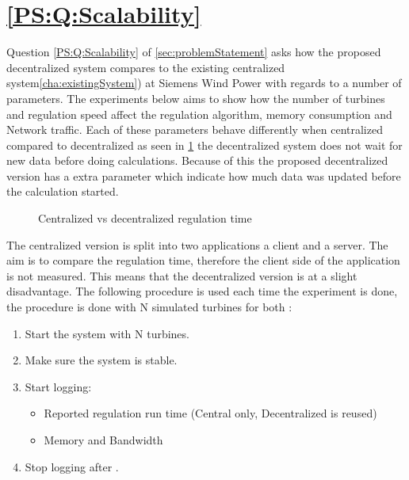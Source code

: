 \section{\ref{PS:Q:Scalability}}
Question \ref{PS:Q:Scalability} of \cref{sec:problemStatement} asks how the proposed decentralized system compares to the existing centralized system\cref{cha:existingSystem}) at Siemens Wind Power with regards to a number of parameters.
The experiments below aims to show how the number of turbines and regulation speed affect the regulation algorithm, memory consumption and Network traffic.
Each of these parameters behave differently when centralized compared to decentralized as seen in \cref{fig:timingCentralVSDecentral} the decentralized system does not wait for new data before doing calculations. Because of this the proposed decentralized version has a extra parameter which indicate how much data was updated before the calculation started.

\begin{figure}[b]
	\centering
	{}
	\newline
	
	\newline
	
	{}
	
	\caption{Centralized vs decentralized regulation time}
	\label{fig:timingCentralVSDecentral}
\end{figure}

	The centralized version is split into two applications a client and a server.
	The aim is to compare the regulation time, therefore the client side of the application is not measured. This means that the decentralized version is at a slight disadvantage.
	The following procedure is used each time the experiment is done, the procedure is done with N simulated turbines for both :

\begin{minipage}{\textwidth}
	\begin{enumerate}
		\item Start the system with N turbines.
		\item Make sure the system is stable.
		\item Start logging:
		\begin{itemize}
			\item Reported regulation run time (Central only, Decentralized is reused)
			\item Memory and Bandwidth
		\end{itemize}
		\item Stop logging after \experiemntRunTime.
		\end{enumerate}
\end{minipage}
